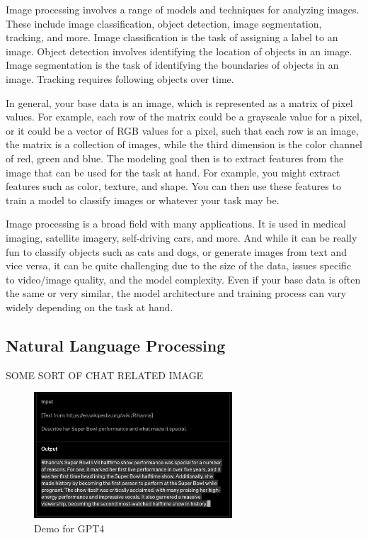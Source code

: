 \documentclass[
  letterpaper,
]{krantz}
\begin{document}
Image processing involves a range of models and techniques for analyzing
images. These include image classification, object detection, image
segmentation, tracking, and more. Image classification is the task of
assigning a label to an image. Object detection involves identifying the
location of objects in an image. Image segmentation is the task of
identifying the boundaries of objects in an image. Tracking requires
following objects over time.

In general, your base data is an image, which is represented as a matrix
of pixel values. For example, each row of the matrix could be a
grayscale value for a pixel, or it could be a vector of RGB values for a
pixel, such that each row is an image, the matrix is a collection of
images, while the third dimension is the color channel of red, green and
blue. The modeling goal then is to extract features from the image that
can be used for the task at hand. For example, you might extract
features such as color, texture, and shape. You can then use these
features to train a model to classify images or whatever your task may
be.

Image processing is a broad field with many applications. It is used in
medical imaging, satellite imagery, self-driving cars, and more. And
while it can be really fun to classify objects such as cats and dogs, or
generate images from text and vice versa, it can be quite challenging
due to the size of the data, issues specific to video/image quality, and
the model complexity. Even if your base data is often the same or very
similar, the model architecture and training process can vary widely
depending on the task at hand.

\subsection{Natural Language
Processing}\label{natural-language-processing}

SOME SORT OF CHAT RELATED IMAGE

\begin{figure}

{\centering \includegraphics[width=0.66\textwidth,height=\textheight]{img/gpt4.png}

}

\caption{\label{fig-gpt4}Demo for GPT4}

\end{figure}
\end{document}
